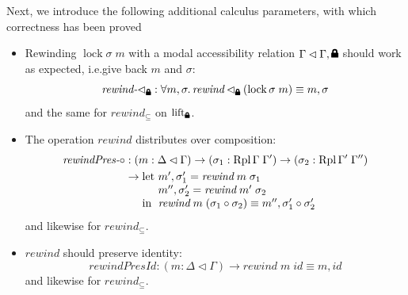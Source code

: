 \documentclass[12pt,twoside,openright]{report}
\numberwithin{equation}{chapter}
\numberwithin{figure}{chapter}
\numberwithin{table}{chapter}
\theoremstyle{definition}\newtheorem{definition}{Definition}
\newcommand{\lock}{\text{\tikz[baseline]{
      \fill[rounded corners=.1ex] (-.75ex,0) rectangle (.75ex,1ex);
      \draw[line width=.3ex] (-.4ex,.5ex) -- ++(0,.75ex) arc (180:0:.4ex) -- ++(0,-.75ex);
}}}
\begin{document}
Next, we introduce the following additional calculus parameters,
with which correctness has been proved
\begin{itemize}
\item Rewinding $\operatorname{lock} \sigma \; m$
  with a modal accessibility relation $\Gamma \lhd \Gamma, \lock$
  should work as expected, i.e.\@ give back $m$ and $\sigma$:
  $$ \textit{rewind-$\lhd_\lock$} : \forall m, \sigma. \, \textit{rewind} \lhd_\lock (\operatorname{lock} \sigma \; m) \equiv m , \sigma $$
  and the same for $\textit{rewind}_\subseteq$ on $\operatorname{lift}_\lock$.
\item The operation $\textit{rewind}$ distributes over composition:
  \begin{equation}\label{eq:rewindPres-circ}
    \begin{split}
      \textit{rewindPres-$\circ$} &: (m : \Delta\lhd\Gamma) \to (\sigma_1 : \operatorname{Rpl} \Gamma \; \Gamma') \to (\sigma_2 : \operatorname{Rpl} \Gamma' \; \Gamma'') \\
      &\to
      \begin{array}[t]{@{}l@{}l@{}}
        \text{let } & m' , \sigma_1' = \textit{rewind} \; m \; \sigma_1 \\
        & m'' , \sigma_2' = \textit{rewind} \; m' \; \sigma_2 \\
        \text{in } & \textit{rewind} \; m \; (\sigma_1 \circ \sigma_2) \equiv m'' , \sigma_1' \circ \sigma_2'
      \end{array}
    \end{split}
  \end{equation}
  and likewise for $\textit{rewind}_\subseteq$.
\item $\textit{rewind}$ should preserve identity:
  $$ \textit{rewindPresId} : (m : \Delta\lhd\Gamma) \to \textit{rewind} \; m \; \textit{id} \equiv m , \textit{id} $$
  and likewise for $\textit{rewind}_\subseteq$.


\end{itemize}
\end{document}
